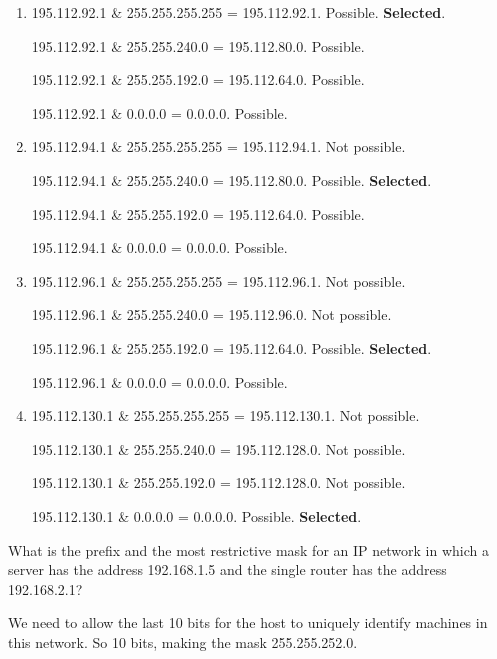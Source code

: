 \begin{Answer}
\begin{enumerate}
    \item 195.112.92.1 \& 255.255.255.255 = 195.112.92.1. Possible. \textbf{Selected}.

    195.112.92.1 \& 255.255.240.0 = 195.112.80.0. Possible.

    195.112.92.1 \& 255.255.192.0 = 195.112.64.0. Possible.

    195.112.92.1 \& 0.0.0.0 = 0.0.0.0. Possible.

    \item 195.112.94.1 \& 255.255.255.255 = 195.112.94.1. Not possible.

    195.112.94.1 \& 255.255.240.0 = 195.112.80.0. Possible. \textbf{Selected}.

    195.112.94.1 \& 255.255.192.0 = 195.112.64.0. Possible.

    195.112.94.1 \& 0.0.0.0 = 0.0.0.0. Possible.

    \item 195.112.96.1 \& 255.255.255.255 = 195.112.96.1. Not possible.

    195.112.96.1 \& 255.255.240.0 = 195.112.96.0. Not possible.

    195.112.96.1 \& 255.255.192.0 = 195.112.64.0. Possible. \textbf{Selected}.

    195.112.96.1 \& 0.0.0.0 = 0.0.0.0. Possible.

    \item 195.112.130.1 \& 255.255.255.255 = 195.112.130.1. Not possible.

    195.112.130.1 \& 255.255.240.0 = 195.112.128.0. Not possible.

    195.112.130.1 \& 255.255.192.0 = 195.112.128.0. Not possible.

    195.112.130.1 \& 0.0.0.0 = 0.0.0.0. Possible. \textbf{Selected}.
\end{enumerate}
\end{Answer}

\begin{Exercise}
\end{Exercise}

\begin{Exercise}
What is the prefix and the most restrictive mask for an IP network in which a server has the address 192.168.1.5 and the single router has the address 192.168.2.1?
\end{Exercise}
\begin{Answer}
We need to allow the last 10 bits for the host to uniquely identify machines in this network.
So 10 bits, making the mask 255.255.252.0.
\end{Answer}

